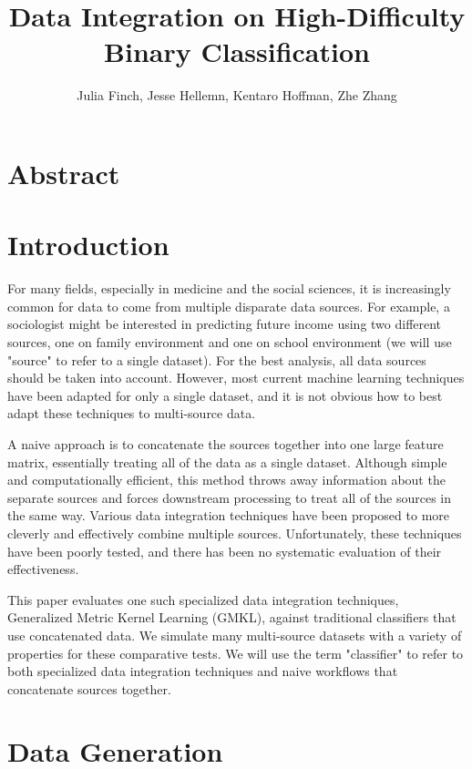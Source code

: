 \documentclass{article}
\begin{document}
\title{Data Integration on High-Difficulty Binary Classification}
\author{Julia Finch, Jesse Hellemn, Kentaro Hoffman, Zhe Zhang}
\maketitle


\section{Abstract}


\section{Introduction}
For many fields, especially in medicine and the social sciences, it is
increasingly common for data to come from multiple disparate data sources. For
example, a sociologist might be interested in predicting future income using
two different sources, one on family environment and one on school environment
(we will use "source" to refer to a single dataset). For the best analysis, all
data sources should be taken into account. However, most current machine
learning techniques have been adapted for only a single dataset, and it is not
obvious how to best adapt these techniques to multi-source data.


A naive approach is to concatenate the sources together into one large feature
matrix, essentially treating all of the data as a single dataset. Although
simple and computationally efficient, this method throws away information about
the separate sources and forces downstream processing to treat all of the
sources in the same way. Various data integration techniques have been proposed
to more cleverly and effectively combine multiple sources. Unfortunately, these
techniques have been poorly tested, and there has been no systematic evaluation
of their effectiveness.


This paper evaluates one such specialized data integration techniques,
Generalized Metric Kernel Learning (GMKL), against traditional classifiers that
use concatenated data. We simulate many multi-source datasets with a variety of
properties for these comparative tests. We will use the term "classifier" to
refer to both specialized data integration techniques and naive workflows that
concatenate sources together.


\section{Data Generation}
\end{document}
